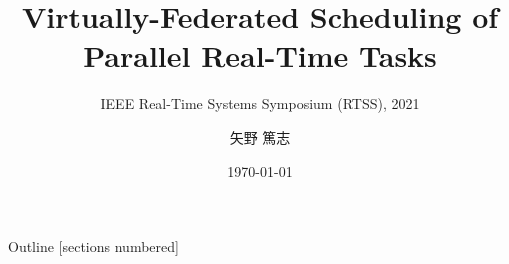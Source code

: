 \newcommand{\beamerDir}[0]{/mnt/c/Users/atsushi/Documents/workspace/env/Beamer/beamer/beamer/}





\newcommand{\forme}[1]{}


\title{Virtually-Federated Scheduling of Parallel Real-Time Tasks}
\subtitle{IEEE Real-Time Systems Symposium (RTSS), 2021}
\author{矢野 篤志}
\date{\today}




\maketitle

% 

\begin{frame}{Outline}
    [sections numbered]
    \scriptsize\tableofcontents[hideallsubsections]
\end{frame}

% 
% 
% 
% 
% 
% 
% 
% 
% 
% 
% 


\lastpage

%     
%     


